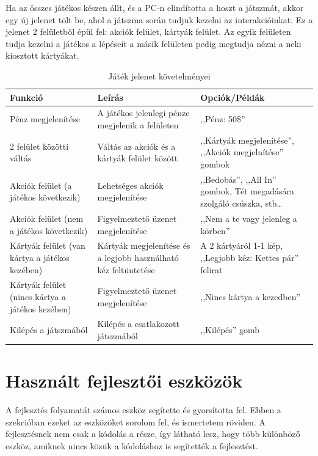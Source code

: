 \documentclass[]{thesis-ekf}
\theoremstyle{definition}
\theoremstyle{remark}
\begin{document}
Ha az összes játékos készen állt, és a PC-n elindította a hoszt a játszmát, akkor egy új jelenet tölt be, ahol a játszma során tudjuk kezelni az interakcióinkat. Ez a jelenet 2 felületből épül fel: akciók felület, kártyák felület. Az egyik felületen tudja kezelni a játékos a lépéseit a másik felületen pedig megtudja nézni a neki kiosztott kártyákat.

\begin{table}[ht!]
	\centering
	\footnotesize
	\begin{tabular}{|p{4cm}|p{7cm}|p{4cm}|}
		\hline
		\textbf{Funkció} & \textbf{Leírás} & \textbf{Opciók/Példák} \\ 
		\hline
		Pénz megjelenítése & A játékos jelenlegi pénze megjelenik a felületen & ,,Pénz: 50\$'' \\ 
		\hline
		2 felület közötti váltás & Váltás az akciók és a kártyák felület között & ,,Kártyák megjelenítése'', ,,Akciók megjelnítése'' gombok \\ 
		\hline
		Akciók felület (a játékos következik) & Lehetséges akciók megjelenítése & ,,Bedobás'', ,,All In'' gombok, Tét megadására szolgáló csúszka, stb\dots \\ 
		\hline
		Akciók felület (nem a játékos következik) & Figyelmeztető üzenet megjelenítése & ,,Nem a te vagy jelenleg a körben'' \\ 
		\hline
		Kártyák felület (van kártya a játékos kezében) & Kártyák megjelenítése és a legjobb használható kéz feltüntetése & A 2 kártyáról 1-1 kép, ,,Legjobb kéz: Kettes pár'' felirat \\ 
		\hline
		Kártyák felület (nincs kártya a játékos kezében) & Figyelmeztető üzenet megjelenítése & ,,Nincs kártya a kezedben'' \\ 
		\hline
		Kilépés a játszmából & Kilépés a csatlakozott játszmából & ,,Kilépés'' gomb \\ 
		\hline
	\end{tabular}
	\caption{Játék jelenet követelményei}
\end{table}

\section{Használt fejlesztői eszközök}

A fejlesztés folyamatát számos eszköz segítette és gyorsította fel. Ebben a szekcióban ezeket az eszközöket sorolom fel, és ismertetem röviden. A fejlesztésnek nem csak a kódolás a része, így látható lesz, hogy több különböző eszköz, amiknek nincs közük a kódoláshoz is segítették a fejlesztést.
\end{document}
